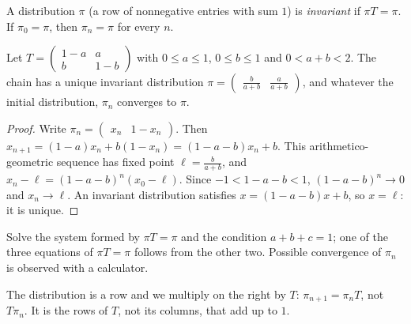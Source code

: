 \begin{definition}
A distribution $\pi$ (a row of nonnegative entries with sum $1$) is \emph{invariant} if $\pi T=\pi$. If $\pi_0=\pi$, then $\pi_n=\pi$ for every $n$.
\end{definition}
\begin{theorem}
Let $T=\begin{pmatrix}1-a&a\\b&1-b\end{pmatrix}$ with $0\le a\le1$, $0\le b\le1$ and $0<a+b<2$. The chain has a unique invariant distribution $\pi=\begin{pmatrix}\frac b{a+b}&\frac a{a+b}\end{pmatrix}$, and whatever the initial distribution, $\pi_n$ converges to $\pi$.
\end{theorem}
\begin{proof}
Write $\pi_n=\begin{pmatrix}x_n&1-x_n\end{pmatrix}$. Then $x_{n+1}=(1-a)x_n+b(1-x_n)=(1-a-b)x_n+b$. This arithmetico-geometric sequence has fixed point $\ell=\frac b{a+b}$, and $x_n-\ell=(1-a-b)^n(x_0-\ell)$. Since $-1<1-a-b<1$, $(1-a-b)^n\to0$ and $x_n\to\ell$. An invariant distribution satisfies $x=(1-a-b)x+b$, so $x=\ell$: it is unique.
\end{proof}
\begin{method}
Solve the system formed by $\pi T=\pi$ and the condition $a+b+c=1$; one of the three equations of $\pi T=\pi$ follows from the other two. Possible convergence of $\pi_n$ is observed with a calculator.
\end{method}
\begin{pitfall}
The distribution is a row and we multiply on the right by $T$: $\pi_{n+1}=\pi_nT$, not $T\pi_n$. It is the rows of $T$, not its columns, that add up to $1$.
\end{pitfall}

\mxnewpage
